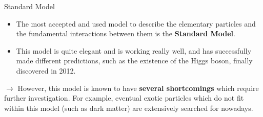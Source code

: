 \documentclass[8 pt]{beamer}
\begin{document}
\begin{frame}{Standard Model}

   \begin{minipage}[c]{.49\linewidth}
   	\begin{itemize}
	\justifying
	\item The most accepted and used model to describe the elementary particles and the fundamental interactions between them is the \textbf{Standard Model}. \vfill \vspace{8pt}
	\item This model is quite elegant and is working really well, and has successfully made different predictions, such as the existence of the Higgs boson, finally discovered in 2012.\vfill
	\end{itemize}
   \end{minipage} \hfill
   \begin{minipage}[c]{.49\linewidth}
   \end{minipage} \hfill \vfill
     
	\justifying
	\begin{block}{}
	\justifying
	\vspace{5pt}
	$\rightarrow$ However, this model is known to have \textbf{several shortcomings} which require further investigation. For example, eventual exotic particles which do not fit within this model (such as dark matter) are extensively searched for nowadays. \vspace{5pt}
	\end{block} \vfill
	
\end{frame}
\end{document}

